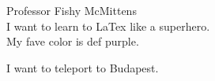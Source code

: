 \documentclass{article}
\begin{document}


\begin{flushright}
Professor Fishy McMittens\\
I want to learn to LaTex like a superhero.\\
My fave color is def purple.
\end{flushright}






I want to teleport to Budapest.

\end{document}
